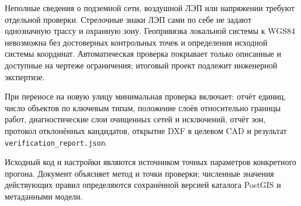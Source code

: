 \documentclass[11pt,a4paper]{article}
\newcommand{\code}[1]{\texttt{#1}}
\begin{document}
Неполные сведения о подземной сети, воздушной ЛЭП или напряжении требуют отдельной проверки. Стрелочные знаки ЛЭП сами по себе не задают однозначную трассу и охранную зону. Геопривязка локальной системы к WGS84 невозможна без достоверных контрольных точек и определения исходной системы координат. Автоматическая проверка покрывает только описанные и доступные на чертеже ограничения; итоговый проект подлежит инженерной экспертизе.

При переносе на новую улицу минимальная проверка включает: отчёт единиц, число объектов по ключевым типам, положение слоёв относительно границы работ, диагностические слои очищенных сетей и исключений, отчёт зон, протокол отклонённых кандидатов, открытие DXF в целевом CAD и результат \code{verification\_report.json}.

\vfill
{\small\color{muted}Исходный код и настройки являются источником точных параметров конкретного прогона. Документ объясняет метод и точки проверки; численные значения действующих правил определяются сохранённой версией каталога PostGIS и метаданными модели.}
\end{document}
